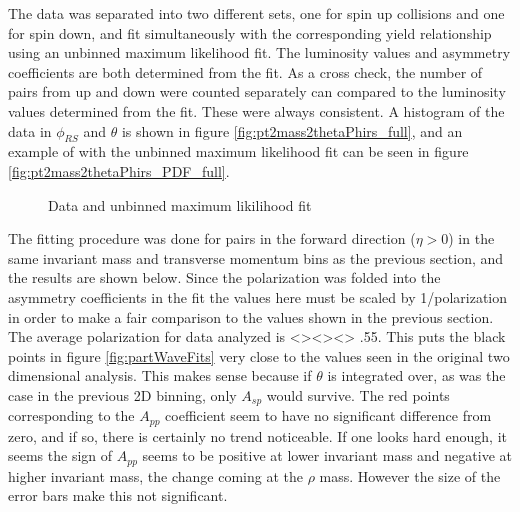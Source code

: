 \documentclass[abstract = on,listof=totoc, bibliography=totoc]{scrreprt}
\newcommand{\phirs}{\phi_{RS}}
\begin{document}
The data was separated into two different sets, one for spin up collisions and one for spin down, and fit simultaneously with the corresponding yield relationship using an unbinned maximum likelihood fit. The luminosity values and asymmetry coefficients are both determined from the fit. As a cross check, the number of pairs from up and down were counted separately can compared to the luminosity values determined from the fit. These were always consistent. A histogram of the data in $\phirs$ and $\theta$ is shown in figure \ref{fig:pt2mass2thetaPhirs_full}, and an example of with the unbinned maximum likelihood fit can be seen in figure \ref{fig:pt2mass2thetaPhirs_PDF_full}.
\begin{figure}[!tbp]
  \centering
  \hfill
  \caption{Data and unbinned maximum likilihood fit}
\end{figure}

The fitting procedure was done for pairs in the forward direction ($\eta > 0$) in the same invariant mass and transverse momentum bins as the previous section, and the results are shown below. Since the polarization was folded into the asymmetry coefficients in the fit the values here must be scaled by 1/polarization in order to make a fair comparison to the values shown in the previous section. The average polarization for data analyzed is <><><> .55. This puts the black points in figure \ref{fig:partWaveFits} very close to the values seen in the original two dimensional analysis. This makes sense because if $\theta$ is integrated over, as was the case in the previous 2D binning, only $A_{sp}$ would survive. The red points corresponding to the $A_{pp}$ coefficient seem to have no significant difference from zero, and if so, there is certainly no trend noticeable. If one looks hard enough, it seems the sign of $A_{pp}$ seems to be positive at lower invariant mass and negative at higher invariant mass, the change coming at the $\rho$ mass. However the size of the error bars make this not significant. 
\end{document}

